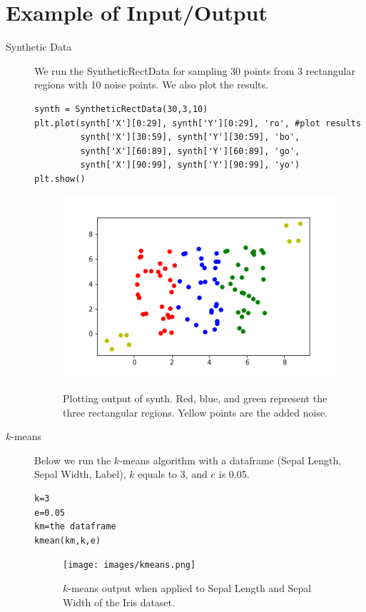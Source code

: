 \documentclass[psamsfonts,onesided,10pt]{amsart}
\begin{document}
\section{Example of Input/Output}
\begin{description}
\item[Synthetic Data] We run the SyntheticRectData for sampling 30 points from 3 
rectangular regions with 10 noise points. We also plot the results.
\begin{verbatim}
synth = SyntheticRectData(30,3,10)
plt.plot(synth['X'][0:29], synth['Y'][0:29], 'ro', #plot results
         synth['X'][30:59], synth['Y'][30:59], 'bo', 
         synth['X'][60:89], synth['Y'][60:89], 'go',
         synth['X'][90:99], synth['Y'][90:99], 'yo')
plt.show()   
\end{verbatim}
\begin{figure}[H]
    \centering
    {\includegraphics[width=.4\textwidth]{images/synth.png}} \\
    \caption{Plotting output of synth. Red, blue, and green represent the three rectangular regions. 
Yellow points are the added noise.}
\end{figure}
\item[$k$-means] Below we run the $k$-means algorithm with a dataframe (Sepal Length, Sepal Width, Label), $k$ equals to 3, and $e$ is 0.05. 
\begin{verbatim}
k=3
e=0.05
km=the dataframe
kmean(km,k,e)
\end{verbatim}
\begin{figure}[H]
    \centering
    {\texttt{[image: images/kmeans.png]}} \\
    \caption{$k$-means output when applied to Sepal Length and Sepal Width of the Iris dataset.}
\end{figure}


\end{description}
\end{document}
